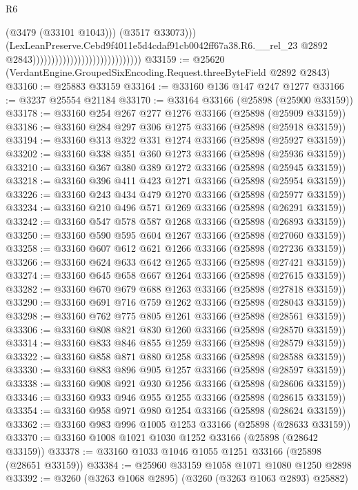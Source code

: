 \begin{lexlean}{R6}
\begin{coremodule}
                                                                  (@3479 (@33101 @1043)))
                                                                (@3517 @33073)))
                                                            (LexLeanPreserve.Cebd9f4011e5d4cdaf91cb0042ff67a38.R6.__rel_23
                                                              @2892
                                                              @2843)))))))))))))))))))))))))))))
@33159 := @25620 (VerdantEngine.GroupedSixEncoding.Request.threeByteField @2892 @2843)
@33160 := @25883 @33159
@33164 := @33160 @136 @147 @247 @1277
@33166 := @3237 @25554 @21184
@33170 := @33164 @33166 (@25898 (@25900 @33159))
@33178 := @33160 @254 @267 @277 @1276 @33166 (@25898 (@25909 @33159))
@33186 := @33160 @284 @297 @306 @1275 @33166 (@25898 (@25918 @33159))
@33194 := @33160 @313 @322 @331 @1274 @33166 (@25898 (@25927 @33159))
@33202 := @33160 @338 @351 @360 @1273 @33166 (@25898 (@25936 @33159))
@33210 := @33160 @367 @380 @389 @1272 @33166 (@25898 (@25945 @33159))
@33218 := @33160 @396 @411 @423 @1271 @33166 (@25898 (@25954 @33159))
@33226 := @33160 @243 @434 @479 @1270 @33166 (@25898 (@25977 @33159))
@33234 := @33160 @210 @496 @571 @1269 @33166 (@25898 (@26291 @33159))
@33242 := @33160 @547 @578 @587 @1268 @33166 (@25898 (@26893 @33159))
@33250 := @33160 @590 @595 @604 @1267 @33166 (@25898 (@27060 @33159))
@33258 := @33160 @607 @612 @621 @1266 @33166 (@25898 (@27236 @33159))
@33266 := @33160 @624 @633 @642 @1265 @33166 (@25898 (@27421 @33159))
@33274 := @33160 @645 @658 @667 @1264 @33166 (@25898 (@27615 @33159))
@33282 := @33160 @670 @679 @688 @1263 @33166 (@25898 (@27818 @33159))
@33290 := @33160 @691 @716 @759 @1262 @33166 (@25898 (@28043 @33159))
@33298 := @33160 @762 @775 @805 @1261 @33166 (@25898 (@28561 @33159))
@33306 := @33160 @808 @821 @830 @1260 @33166 (@25898 (@28570 @33159))
@33314 := @33160 @833 @846 @855 @1259 @33166 (@25898 (@28579 @33159))
@33322 := @33160 @858 @871 @880 @1258 @33166 (@25898 (@28588 @33159))
@33330 := @33160 @883 @896 @905 @1257 @33166 (@25898 (@28597 @33159))
@33338 := @33160 @908 @921 @930 @1256 @33166 (@25898 (@28606 @33159))
@33346 := @33160 @933 @946 @955 @1255 @33166 (@25898 (@28615 @33159))
@33354 := @33160 @958 @971 @980 @1254 @33166 (@25898 (@28624 @33159))
@33362 := @33160 @983 @996 @1005 @1253 @33166 (@25898 (@28633 @33159))
@33370 := @33160 @1008 @1021 @1030 @1252 @33166 (@25898 (@28642 @33159))
@33378 := @33160 @1033 @1046 @1055 @1251 @33166 (@25898 (@28651 @33159))
@33384 := @25960 @33159 @1058 @1071 @1080 @1250 @2898
@33392 := @3260 (@3263 @1068 @2895) (@3260 (@3263 @1063 @2893) @25882)

\end{coremodule}
\end{lexlean}
